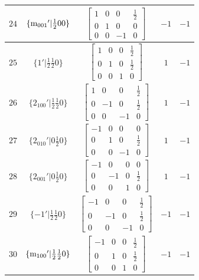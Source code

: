 \documentclass[fleqn,8pt]{jsarticle}
\begin{document}
\begin{longtable}{ccccc}
$ 24 $ & $ \{{\rm m}_{001}{}'|\frac{1}{2} 0 0\} $ & $ \begin{bmatrix} 1 & 0 & 0 & \frac{1}{2} \\ 0 & 1 & 0 & 0 \\ 0 & 0 & -1 & 0 \end{bmatrix} $ & $ -1 $ & $ -1 $ \\ \hline
$ 25 $ & $ \{1{}'|\frac{1}{2} \frac{1}{2} 0\} $ & $ \begin{bmatrix} 1 & 0 & 0 & \frac{1}{2} \\ 0 & 1 & 0 & \frac{1}{2} \\ 0 & 0 & 1 & 0 \end{bmatrix} $ & $ 1 $ & $ -1 $ \\ \hline
$ 26 $ & $ \{2{}_{100}{}'|\frac{1}{2} \frac{1}{2} 0\} $ & $ \begin{bmatrix} 1 & 0 & 0 & \frac{1}{2} \\ 0 & -1 & 0 & \frac{1}{2} \\ 0 & 0 & -1 & 0 \end{bmatrix} $ & $ 1 $ & $ -1 $ \\ \hline
$ 27 $ & $ \{2{}_{010}{}'|0 \frac{1}{2} 0\} $ & $ \begin{bmatrix} -1 & 0 & 0 & 0 \\ 0 & 1 & 0 & \frac{1}{2} \\ 0 & 0 & -1 & 0 \end{bmatrix} $ & $ 1 $ & $ -1 $ \\ \hline
$ 28 $ & $ \{2{}_{001}{}'|0 \frac{1}{2} 0\} $ & $ \begin{bmatrix} -1 & 0 & 0 & 0 \\ 0 & -1 & 0 & \frac{1}{2} \\ 0 & 0 & 1 & 0 \end{bmatrix} $ & $ 1 $ & $ -1 $ \\ \hline
$ 29 $ & $ \{-1{}'|\frac{1}{2} \frac{1}{2} 0\} $ & $ \begin{bmatrix} -1 & 0 & 0 & \frac{1}{2} \\ 0 & -1 & 0 & \frac{1}{2} \\ 0 & 0 & -1 & 0 \end{bmatrix} $ & $ -1 $ & $ -1 $ \\ \hline
$ 30 $ & $ \{{\rm m}_{100}{}'|\frac{1}{2} \frac{1}{2} 0\} $ & $ \begin{bmatrix} -1 & 0 & 0 & \frac{1}{2} \\ 0 & 1 & 0 & \frac{1}{2} \\ 0 & 0 & 1 & 0 \end{bmatrix} $ & $ -1 $ & $ -1 $ \\ \hline

\end{longtable}
\end{document}

